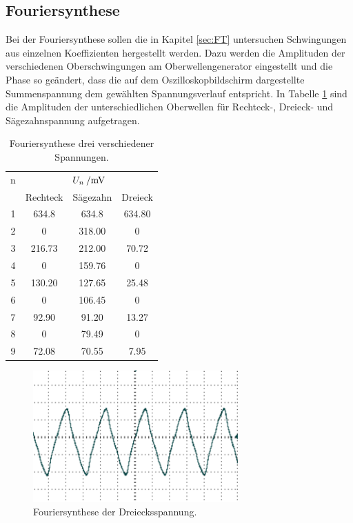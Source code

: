 \subsection{Fouriersynthese}
Bei der Fouriersynthese sollen die in Kapitel \ref{sec:FT} untersuchen Schwingungen aus einzelnen Koeffizienten hergestellt werden. Dazu werden die Amplituden der verschiedenen Oberschwingungen am Oberwellengenerator eingestellt und die Phase so geändert, dass die auf dem Oszilloskopbildschirm dargestellte Summenspannung dem gewählten Spannungsverlauf entspricht. In Tabelle \ref{tab:FS} sind die Amplituden der unterschiedlichen Oberwellen für Rechteck-, Dreieck- und Sägezahnspannung aufgetragen.

\begin{table}
	\centering
	\begin{tabular}{cccc}	
	\toprule
\multicolumn{1}{c}{n} & \multicolumn{3}{c}{$U_n\:/\si{\milli{\volt}}$}\\
	{} & {Rechteck} & {Sägezahn} & {Dreieck}\\
	\midrule
 1 & 634.8  & 634.8  & 634.80\\
 2 &   0    & 318.00 &   0\\
 3 & 216.73 & 212.00 &  70.72\\
 4 &   0    & 159.76 &   0\\
 5 & 130.20 & 127.65 &  25.48\\
 6 &   0    & 106.45 &   0\\
 7 &  92.90 &  91.20 &  13.27\\
 8 &   0    &  79.49 &   0\\
 9 &  72.08 &  70.55 &  7.95\\
	\bottomrule
	\end{tabular}
	\caption{Fouriersynthese drei verschiedener Spannungen.}
	\label{tab:FS}
\end{table}






\begin{figure}
	\centering
		\includegraphics[width=0.7\textwidth]{Bilder/1-9_DE.pdf}		
\caption{Fouriersynthese der Dreiecksspannung.}
	\label{fig:1-9_DE}
\end{figure}






